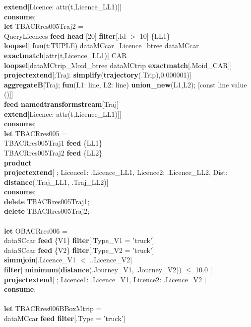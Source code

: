 \documentclass[a4paper]{article}
\newcommand{\op}[1]{\textbf{#1}}
\begin{document}
\begin{scriptsize}
\begin{tabbing}
\>\op{extend}[Licence: attr(t,Licence\_LL1)]]\\
\op{consume};\\
\op{let} TBACRres005Traj2 =\\
\>QueryLicences \op{feed head} [20] \op{filter}[.Id $>$ 10] \{LL1\}\\
\>\op{loopsel}[ \op{fun}(t:TUPLE) dataMCcar\_Licence\_btree dataMCcar \op{exactmatch}[attr(t,Licence\_LL1)] {CAR}\\
\>\>\op{loopsel}[dataMCtrip\_Moid\_btree dataMCtrip \op{exactmatch}[.Moid\_CAR]]\\
\>\op{projectextend}[;Traj: \op{simplify}(\op{trajectory}(.Trip),0.000001)]\\
\>\op{aggregateB}[Traj; \op{fun}(L1: line, L2: line) \op{ union\_new}(L1,L2); [const line value ()]]\\
\>\op{feed namedtransformstream}[Traj]\\
\>\op{extend}[Licence: attr(t,Licence\_LL1)]]\\
\op{consume};\\
\op{let} TBACRres005 = \\
\>TBACRres005Traj1 \op{feed} \{LL1\}\\
\>TBACRres005Traj2 \op{feed} \{LL2\}\\
\>\op{product}\\
\>\op{projectextend}[ ; Licence1: .Licence\_LL1, Licence2: .Licence\_LL2, Dist: \op{distance}(.Traj\_LL1, .Traj\_LL2)]\\
\op{consume};\\
\op{delete} TBACRres005Traj1;\\
\op{delete} TBACRres005Traj2;\\
\\
\op{let} OBACRres006 =\\
\>dataSCcar \op{feed} \{V1\} \op{filter}[.Type\_V1 = 'truck']\\
\>dataSCcar \op{feed} \{V2\} \op{filter}[.Type\_V2 = 'truck']\\
\>\op{simmjoin}[.Licence\_V1 $<$ ..Licence\_V2]\\
\>\op{filter}[ \op{minimum}(\op{distance}(.Journey\_V1, .Journey\_V2)) $\leq$ 10.0 ]\\
\>\op{projectextend}[ ; Licence1: .Licence\_V1, Licence2: .Licence\_V2 ]\\
\op{consume};\\
\\
\op{let} TBACRres006BBoxMtrip =\\
\>dataMCcar \op{feed filter}[.Type = 'truck']\\

\end{tabbing}
\end{scriptsize}
\end{document}
